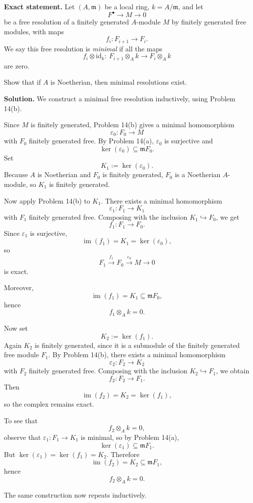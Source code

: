 \documentclass[12pt,a4paper]{article}
\theoremstyle{plain}
\theoremstyle{definition}      %
\begin{document}
\textbf{Exact statement.}
Let \((A,\mathfrak m)\) be a local ring, \(k=A/\mathfrak m\), and let
\[
F^\bullet \to M \to 0
\]
be a free resolution of a finitely generated \(A\)-module \(M\) by finitely generated free modules, with maps
\[
f_i:F_{i+1}\to F_i.
\]
We say this free resolution is \emph{minimal} if all the maps
\[
f_i\otimes \mathrm{id}_k:\ F_{i+1}\otimes_A k \to F_i\otimes_A k
\]
are zero.

Show that if \(A\) is Noetherian, then minimal resolutions exist.

\textbf{Solution.}
We construct a minimal free resolution inductively, using Problem 14(b).

\medskip

Since \(M\) is finitely generated, Problem 14(b) gives a minimal homomorphism
\[
\varepsilon_0:F_0\to M
\]
with \(F_0\) finitely generated free. By Problem 14(a), \(\varepsilon_0\) is surjective and
\[
\ker(\varepsilon_0)\subseteq \mathfrak m F_0.
\]
Set
\[
K_1:=\ker(\varepsilon_0).
\]
Because \(A\) is Noetherian and \(F_0\) is finitely generated, \(F_0\) is a Noetherian \(A\)-module, so \(K_1\) is finitely generated.

Now apply Problem 14(b) to \(K_1\). There exists a minimal homomorphism
\[
\varepsilon_1:F_1\to K_1
\]
with \(F_1\) finitely generated free. Composing with the inclusion \(K_1\hookrightarrow F_0\), we get
\[
f_1:F_1\to F_0.
\]
Since \(\varepsilon_1\) is surjective,
\[
\operatorname{im}(f_1)=K_1=\ker(\varepsilon_0),
\]
so
\[
F_1\xrightarrow{f_1}F_0\xrightarrow{\varepsilon_0}M\to 0
\]
is exact.

Moreover,
\[
\operatorname{im}(f_1)=K_1\subseteq \mathfrak m F_0,
\]
hence
\[
f_1\otimes_A k=0.
\]

Now set
\[
K_2:=\ker(f_1).
\]
Again \(K_2\) is finitely generated, since it is a submodule of the finitely generated free module \(F_1\). By Problem 14(b), there exists a minimal homomorphism
\[
\varepsilon_2:F_2\to K_2
\]
with \(F_2\) finitely generated free. Composing with the inclusion \(K_2\hookrightarrow F_1\), we obtain
\[
f_2:F_2\to F_1.
\]
Then
\[
\operatorname{im}(f_2)=K_2=\ker(f_1),
\]
so the complex remains exact.

To see that
\[
f_2\otimes_A k=0,
\]
observe that \(\varepsilon_1:F_1\to K_1\) is minimal, so by Problem 14(a),
\[
\ker(\varepsilon_1)\subseteq \mathfrak m F_1.
\]
But \(\ker(\varepsilon_1)=\ker(f_1)=K_2\). Therefore
\[
\operatorname{im}(f_2)=K_2\subseteq \mathfrak m F_1,
\]
hence
\[
f_2\otimes_A k=0.
\]

The same construction now repeats inductively.
\end{document}
